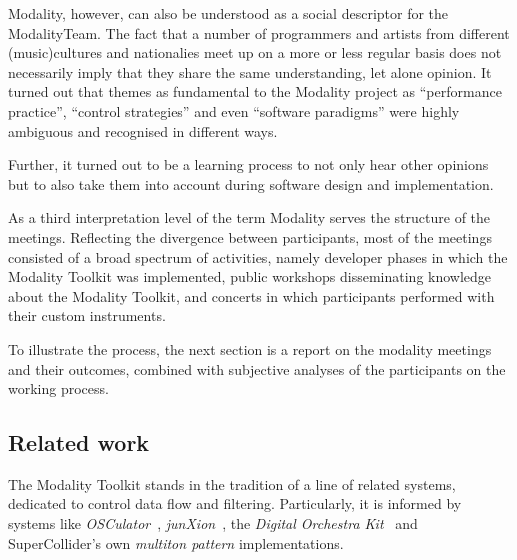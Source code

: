 \documentclass{article}
\begin{document}
Modality, however, can also be understood as a social descriptor for the ModalityTeam.
The fact that a number of programmers and artists from different (music)cultures and nationalies meet up on a more or less regular basis does not necessarily imply that they share the same  understanding, let alone opinion.
It turned out that themes as fundamental to the Modality project as ``performance practice'', ``control strategies'' and even ``software paradigms'' were highly ambiguous and recognised in different ways.

Further, it turned out to be a learning process to not only hear other opinions but to also take them into account during software design and implementation.

As a third interpretation level of the term Modality serves the structure of the meetings.
Reflecting the divergence between participants, most of the meetings consisted of a broad spectrum of activities, namely developer phases in which the Modality Toolkit was implemented, public workshops disseminating knowledge about the Modality Toolkit, and concerts in which participants performed with their custom instruments.

To illustrate the process, the next section is a report on the modality meetings and their outcomes, combined with subjective analyses of the participants on the working process.





\subsection{Related work}
\label{sec:related_work}

The Modality Toolkit stands in the tradition of a line of related systems, dedicated to control data flow and filtering.
Particularly, it is informed by systems like \emph{OSCulator}~\cite{troillard2012-osc}, \emph{junXion}~\cite{-jun}, the \emph{Digital Orchestra Kit}~\cite{malloch2008-a-n} and SuperCollider's own \emph{multiton pattern} implementations.
\end{document}
